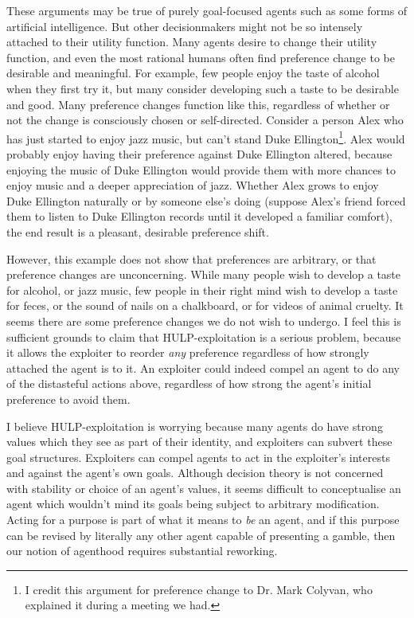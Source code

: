 \documentclass{article}
\begin{document}
These arguments may be true of purely goal-focused agents such as some forms of artificial intelligence. But other decisionmakers might not be so intensely attached to their utility function. Many agents desire to change their utility function, and even the most rational humans often find preference change to be desirable and meaningful. For example, few people enjoy the taste of alcohol when they first try it, but many consider developing such a taste to be desirable and good. Many preference changes function like this, regardless of whether or not the change is consciously chosen or self-directed. Consider a person Alex who has just started to enjoy jazz music, but can't stand Duke Ellington\footnote{I credit this argument for preference change to Dr. Mark Colyvan, who explained it during a meeting we had.}. Alex would probably enjoy having their preference against Duke Ellington altered, because enjoying the music of Duke Ellington would provide them with more chances to enjoy music and a deeper appreciation of jazz. Whether Alex grows to enjoy Duke Ellington naturally or by someone else's doing (suppose Alex's friend forced them to listen to Duke Ellington records until it developed a familiar comfort), the end result is a pleasant, desirable preference shift.

However, this example does not show that preferences are arbitrary, or that preference changes are unconcerning. While many people wish to develop a taste for alcohol, or jazz music, few people in their right mind wish to develop a taste for feces, or the sound of nails on a chalkboard, or for videos of animal cruelty. It seems there are some preference changes we do not wish to undergo. I feel this is sufficient grounds to claim that HULP-exploitation is a serious problem, because it allows the exploiter to reorder \textit{any} preference regardless of how strongly attached the agent is to it. An exploiter could indeed compel an agent to do any of the distasteful actions above, regardless of how strong the agent's initial preference to avoid them.

I believe HULP-exploitation is worrying because many agents do have strong values which they see as part of their identity, and exploiters can subvert these goal structures. Exploiters can compel agents to act in the exploiter's interests and against the agent's own goals. Although decision theory is not concerned with stability or choice of an agent's values, it seems difficult to conceptualise an agent which wouldn't mind its goals being subject to arbitrary modification. Acting for a purpose is part of what it means to \textit{be} an agent, and if this purpose can be revised by literally any other agent capable of presenting a gamble, then our notion of agenthood requires substantial reworking.
\end{document}
